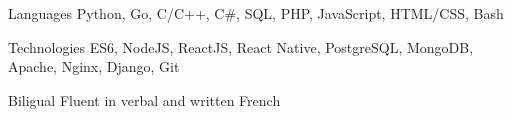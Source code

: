 


\begin{cvskills}

\cvskill
{Languages} %
{Python, Go, C/C++, C\#, SQL, PHP, JavaScript, HTML/CSS, Bash} %


\cvskill
{Technologies} %
{ES6, NodeJS, ReactJS, React Native, PostgreSQL, MongoDB, Apache, Nginx, Django, Git} %


\cvskill
{Biligual} %
{Fluent in verbal and written French} %


\end{cvskills}
\addvspace{2ex}
